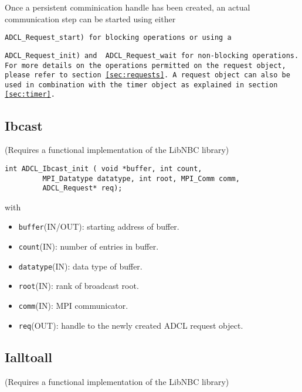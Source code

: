 Once a persistent comminication handle has been created, an actual
communication step can be started using either {\tt ADCL\_Request\_start)
for blocking operations or using a {\tt ADCL\_Request\_init) and {\tt
ADCL\_Request\_wait} for non-blocking operations. For more details on the
  operations permitted on the request object, please refer to section
  \ref{sec:requests}. A request object can also be used in combination with
  the timer object as explained in section \ref{sec:timer}.
 

\subsection{Ibcast}

(Requires a functional implementation of the LibNBC library)

\begin{verbatim}
int ADCL_Ibcast_init ( void *buffer, int count,
         MPI_Datatype datatype, int root, MPI_Comm comm, 
         ADCL_Request* req);
\end{verbatim}
with
\begin{itemize}
\item {\tt buffer}(IN/OUT): starting address of buffer.
\item {\tt count}(IN): number of entries in buffer.
\item {\tt datatype}(IN): data type of buffer.
\item {\tt root}(IN): rank of broadcast root.
\item {\tt comm}(IN): MPI communicator.
\item {\tt req}(OUT): handle to the newly created ADCL request object.
\end{itemize}

\subsection{Ialltoall}

(Requires a functional implementation of the LibNBC library)

}}
